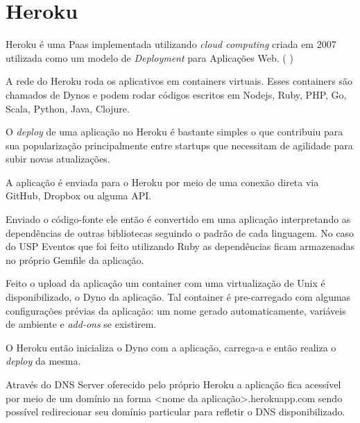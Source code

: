 \section{Heroku}
\par Heroku é uma Paas implementada utilizando \emph{cloud computing} criada em 2007 utilizada como um modelo de \emph{Deployment} para Aplicações Web. ( \cite{herokuwiki})
\par A rede do Heroku roda os aplicativos em containers virtuais. Esses containers são chamados de Dynos e podem rodar códigos escritos em Nodejs, Ruby, PHP, Go, Scala, Python, Java, Clojure.
\par O \emph{deploy} de uma aplicação no Heroku é bastante simples o que contribuiu para sua popularização principalmente entre startups que necessitam de agilidade para subir novas atualizações.
\par A aplicação é enviada para o Heroku por meio de uma conexão direta via GitHub, Dropbox ou alguma API.
\par Enviado o código-fonte ele então é convertido em uma aplicação interpretando as dependências de outras bibliotecas seguindo o padrão de cada linguagem. No caso do USP Eventos que foi feito utilizando Ruby as dependências ficam armazenadas no próprio Gemfile da aplicação.
\par Feito o upload da aplicação um container com uma virtualização de Unix é disponibilizado, o Dyno da aplicação. Tal container é pre-carregado com algumas configurações prévias da aplicação: um nome gerado automaticamente, variáveis de ambiente e \emph{add-ons} se existirem.
\par O Heroku então inicializa o Dyno com a aplicação, carrega-a e então realiza o \emph{deploy} da mesma.
\par Através do DNS Server oferecido pelo próprio Heroku a aplicação fica acessível por meio de um domínio na forma <nome da aplicação>.herokuapp.com sendo possível redirecionar seu domínio particular para refletir o DNS disponibilizado.
